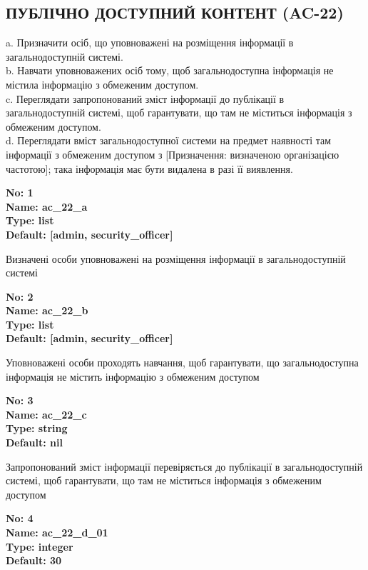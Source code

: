 \documentclass{article}
\begin{document}
\subsection{ПУБЛІЧНО ДОСТУПНИЙ КОНТЕНТ (AC-22)}
a. Призначити осіб, що уповноважені на розміщення інформації в загальнодоступній системі.\\ 
b. Навчати уповноважених осіб тому, щоб загальнодоступна інформація не містила інформацію з обмеженим доступом.\\ 
c. Переглядати запропонований зміст інформації до публікації в загальнодоступній системі, щоб гарантувати, що там не міститься інформація з обмеженим доступом.\\ 
d. Переглядати вміст загальнодоступної системи на предмет наявності там інформації з обмеженим доступом з [Призначення: визначеною організацією частотою]; така інформація має бути видалена в разі її виявлення.

\vspace{10pt}
{\footnotesize\bfseries
No: 1\\
Name: ac\_\allowbreak{}22\_\allowbreak{}a\\
Type: list\\
Default: [\textquotedbl{}admin\textquotedbl{}, \textquotedbl{}security\_\allowbreak{}officer\textquotedbl{}]
}

{\footnotesize Визначені особи уповноважені на розміщення інформації в загальнодоступній системі}


{\footnotesize\bfseries
No: 2\\
Name: ac\_\allowbreak{}22\_\allowbreak{}b\\
Type: list\\
Default: [\textquotedbl{}admin\textquotedbl{}, \textquotedbl{}security\_\allowbreak{}officer\textquotedbl{}]
}

{\footnotesize Уповноважені особи проходять навчання, щоб гарантувати, що загальнодоступна інформація не містить інформацію з обмеженим доступом}


{\footnotesize\bfseries
No: 3\\
Name: ac\_\allowbreak{}22\_\allowbreak{}c\\
Type: string\\
Default: nil
}

{\footnotesize Запропонований зміст інформації перевіряється до публікації в загальнодоступній системі, щоб гарантувати, що там не міститься інформація з обмеженим доступом}


{\footnotesize\bfseries
No: 4\\
Name: ac\_\allowbreak{}22\_\allowbreak{}d\_\allowbreak{}01\\
Type: integer\\
Default: 30
}
\end{document}
